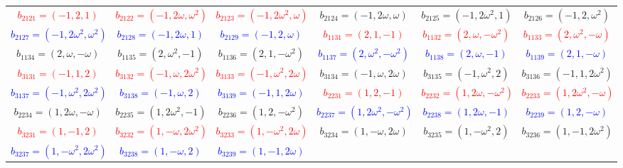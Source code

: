 \documentclass[%
  reprint,
  superscriptaddress,
  showpacs,
  showkeys,
  amsmath,amssymb,
  pra,
  longbibliography,
  floatfix,
  x11names
]{revtex4-2}
\begin{document}
\begin{table}[htbp!]
\begin{ruledtabular}
\begin{tabular}{*{6}{c}}
\textcolor{red}{$b_{2121}=(-1,2,1)$} & \textcolor{red}{$b_{2122}=(-1,2\omega,\omega^2)$} & \textcolor{red}{$b_{2123}=(-1,2\omega^2,\omega)$} & \textcolor{green!40!black}{$b_{2124}=(-1,2\omega,\omega)$} & \textcolor{green!40!black}{$b_{2125}=(-1,2\omega^2,1)$} & \textcolor{green!40!black}{$b_{2126}=(-1,2,\omega^2)$} \\
\textcolor{blue}{$b_{2127}=(-1,2\omega^2,\omega^2)$} & \textcolor{blue}{$b_{2128}=(-1,2\omega,1)$} & \textcolor{blue}{$b_{2129}=(-1,2,\omega)$} & \textcolor{red}{$b_{1131}=(2,1,-1)$} & \textcolor{red}{$b_{1132}=(2,\omega,-\omega^2)$} & \textcolor{red}{$b_{1133}=(2,\omega^2,-\omega)$} \\
\textcolor{green!40!black}{$b_{1134}=(2,\omega,-\omega)$} & \textcolor{green!40!black}{$b_{1135}=(2,\omega^2,-1)$} & \textcolor{green!40!black}{$b_{1136}=(2,1,-\omega^2)$} & \textcolor{blue}{$b_{1137}=(2,\omega^2,-\omega^2)$} & \textcolor{blue}{$b_{1138}=(2,\omega,-1)$} & \textcolor{blue}{$b_{1139}=(2,1,-\omega)$} \\
\textcolor{red}{$b_{3131}=(-1,1,2)$} & \textcolor{red}{$b_{3132}=(-1,\omega,2\omega^2)$} & \textcolor{red}{$b_{3133}=(-1,\omega^2,2\omega)$} & \textcolor{green!40!black}{$b_{3134}=(-1,\omega,2\omega)$} & \textcolor{green!40!black}{$b_{3135}=(-1,\omega^2,2)$} & \textcolor{green!40!black}{$b_{3136}=(-1,1,2\omega^2)$} \\
\textcolor{blue}{$b_{3137}=(-1,\omega^2,2\omega^2)$} & \textcolor{blue}{$b_{3138}=(-1,\omega,2)$} & \textcolor{blue}{$b_{3139}=(-1,1,2\omega)$} & \textcolor{red}{$b_{2231}=(1,2,-1)$} & \textcolor{red}{$b_{2232}=(1,2\omega,-\omega^2)$} & \textcolor{red}{$b_{2233}=(1,2\omega^2,-\omega)$} \\
\textcolor{green!40!black}{$b_{2234}=(1,2\omega,-\omega)$} & \textcolor{green!40!black}{$b_{2235}=(1,2\omega^2,-1)$} & \textcolor{green!40!black}{$b_{2236}=(1,2,-\omega^2)$} & \textcolor{blue}{$b_{2237}=(1,2\omega^2,-\omega^2)$} & \textcolor{blue}{$b_{2238}=(1,2\omega,-1)$} & \textcolor{blue}{$b_{2239}=(1,2,-\omega)$} \\
\textcolor{red}{$b_{3231}=(1,-1,2)$} & \textcolor{red}{$b_{3232}=(1,-\omega,2\omega^2)$} & \textcolor{red}{$b_{3233}=(1,-\omega^2,2\omega)$} & \textcolor{green!40!black}{$b_{3234}=(1,-\omega,2\omega)$} & \textcolor{green!40!black}{$b_{3235}=(1,-\omega^2,2)$} & \textcolor{green!40!black}{$b_{3236}=(1,-1,2\omega^2)$} \\
\textcolor{blue}{$b_{3237}=(1,-\omega^2,2\omega^2)$} & \textcolor{blue}{$b_{3238}=(1,-\omega,2)$} & \textcolor{blue}{$b_{3239}=(1,-1,2\omega)$} & & & \\
\end{tabular}
\end{ruledtabular}
\end{table}
\end{document}
